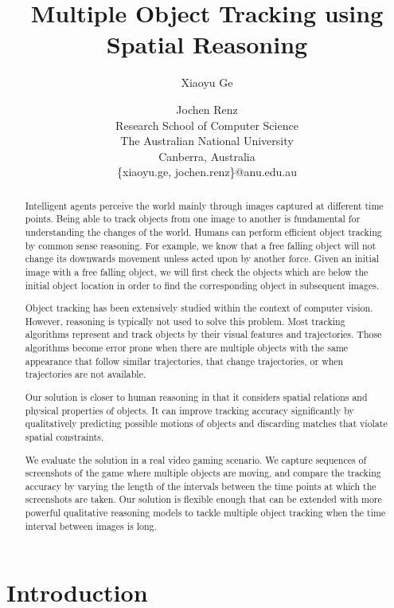 \documentclass[letterpaper]{article}
\title{Multiple Object Tracking using Spatial Reasoning}
\author{Xiaoyu Ge \and Jochen Renz \\
Research School of Computer Science\\
The Australian National University \\
Canberra, Australia\\
\{xiaoyu.ge, jochen.renz\}@anu.edu.au
}
\begin{document}
\maketitle    
\begin{abstract}
Intelligent agents perceive the world mainly through images captured at  different time points. Being able to track objects from one image to another is fundamental for understanding the changes of the world. 
Humans can perform efficient object tracking by common sense reasoning. For example, we know that a free falling object will not change its downwards movement unless acted upon by another force. Given an initial image with a free falling object, we will first check the objects which are below the initial object location in order to find the corresponding object in subsequent images. 

Object tracking has been extensively studied within the context of computer vision. However, reasoning is typically not used to solve this problem. Most tracking algorithms represent and track objects by their visual features and trajectories. Those algorithms become error prone when there are multiple objects with the same appearance that follow similar trajectories, that change trajectories, or when trajectories are not available. 


Our solution is closer to human reasoning in that it considers spatial relations and physical properties of objects. It can improve tracking accuracy significantly by qualitatively predicting possible motions of objects and discarding matches that violate spatial constraints. 

We evaluate the solution in a real video gaming scenario. We capture sequences of screenshots of the game where multiple objects are moving, and compare the tracking accuracy by varying the length of the intervals between the time points at which the screenshots are taken. Our solution is flexible enough that can be extended with more powerful qualitative reasoning models to tackle multiple object tracking when the time interval between images is long. 
\end{abstract}
\section{Introduction}
\end{document}

